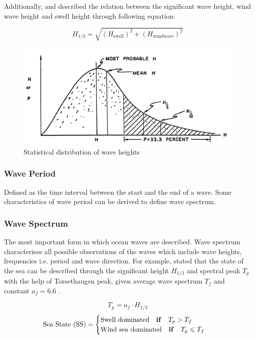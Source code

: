 Additionally,  and  described the relation between the significant wave height, wind wave height and swell height through following equation:

\begin{equation}\label{eqn:H_sig_root}
    H_{1/3} = \sqrt{(H_{\text{swell}})^2 + (H_{\text{windwave}})^2} 
\end{equation}

\begin{figure}[h]
    \centering
        \includegraphics[width=.75\textwidth]{02_figures/Bretschneider_1965_wavedist.jpg}
        \caption{Statistical distribution of wave heights }
        \label{fig:wavestats}
\end{figure}

\subsubsection*{Wave Period}

Defined as the time interval between the start and the end of a wave. Some characteristics of wave period can be derived to define wave spectrum.

\subsubsection*{Wave Spectrum}

The most important form in which ocean waves are described. Wave spectrum characterises all possible observations of the waves which include wave heights, frequencies i.e. period and wave direction. For example,  stated that the state of the sea can be described through the significant height $H_{1/3}$ and spectral peak $T_p$ with the help of Torsethaugen peak, given average wave spectrum $T_f$ and constant $a_f = 6.6$  . 

\begin{equation}\label{eqn:T_p_spectralpeak}
    T_p = a_f\cdot H_{1/3}
\end{equation}
\begin{equation}\label{eqn:currdir}
    \text{Sea State (SS)} = 
    \begin{cases}
        \text{Swell dominated} \quad \text{\textbf{if}} \quad T_p > T_f \\ 
        \text{Wind sea dominated} \quad \text{\textbf{if}} \quad T_p \leqslant T_f \\   
    \end{cases}   
\end{equation}

